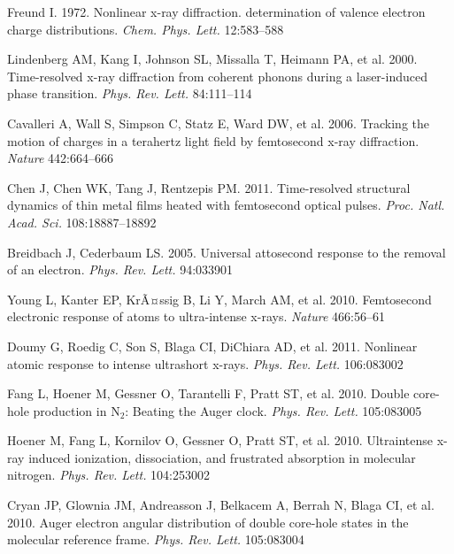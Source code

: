 \documentclass{ar-1col}
\begin{document}
\begin{thebibliography}{000}
Freund I. 1972. Nonlinear {x-ray} diffraction. determination of valence
  electron charge distributions. \textit{Chem. Phys. Lett.} 12:583--588

Lindenberg AM, Kang I, Johnson SL, Missalla T, Heimann PA, et al. 2000.
  {Time-resolved} {x-ray} diffraction from coherent phonons during a
  {laser-induced} phase transition. \textit{Phys. Rev. Lett.} 84:111--114

Cavalleri A, Wall S, Simpson C, Statz E, Ward DW, et al. 2006. Tracking the motion of charges in a terahertz light field by
  femtosecond {x-r}ay diffraction. \textit{Nature} 442:664--666

Chen J, Chen WK, Tang J, Rentzepis PM. 2011. Time-resolved structural dynamics
  of thin metal films heated with femtosecond optical pulses. \textit{Proc.
  Natl. Acad. Sci.} 108:18887--18892

Breidbach J, Cederbaum LS. 2005. Universal attosecond response to the removal
  of an electron. \textit{Phys. Rev. Lett.} 94:033901

Young L, Kanter EP, KrÃ¤ssig B, Li Y, March AM, et al. 2010. Femtosecond electronic response of atoms to
  ultra-intense {x-rays}. \textit{Nature} 466:56--61

Doumy G, Roedig C, Son S, Blaga CI, {DiChiara} AD, et al. 2011. Nonlinear atomic
  response to intense ultrashort {x-r}ays. \textit{Phys. Rev. Lett.} 106:083002

Fang L, Hoener M, Gessner O, Tarantelli F, Pratt ST, et al. 2010. Double core-hole
  production in $\textrm{N}_{2}$: Beating the {A}uger clock. \textit{Phys. Rev.
  Lett.} 105:083005

Hoener M, Fang L, Kornilov O, Gessner O, Pratt ST, et al. 2010. Ultraintense
  {x-ray} induced ionization, dissociation, and frustrated absorption in
  molecular nitrogen. \textit{Phys. Rev. Lett.} 104:253002

Cryan JP, Glownia JM, Andreasson J, Belkacem A, Berrah N, Blaga CI, et al. 2010. Auger electron angular
  distribution of double {core-hole} states in the molecular reference frame.
  \textit{Phys. Rev. Lett.} 105:083004


\end{thebibliography}
\end{document}

